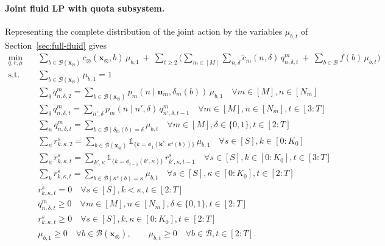 \documentclass{article}
\begin{document}
\paragraph{Joint fluid LP with quota subsystem.} Representing the complete distribution of the joint action by the variables $\mu_{b,t}$ of
Section~\ref{sec:full-fluid} gives
\begin{subequations}\label{eq:fluid-quota-subsystem}
\begin{align}
\min_{q,r,\mu} \quad
& \sum_{b \in \mathcal{B}(\mathbf{x}_\otimes)} c_\otimes(\mathbf{x}_\otimes,b)\, \mu_{b,1}
\ +\ \sum_{t \ge 2} \Bigg( \sum_{m \in [M]} \sum_{n,\delta} \tilde c_m(n,\delta)\,q^m_{n,\delta,t}
\ +\ \sum_{b \in \mathcal{B}} f(b)\,\mu_{b,t} \Bigg)
\label{eq:fluid-quota-subsystem-obj}\\
\text{s.t.} \quad
& \sum_{b \in \mathcal{B}(\mathbf{x}_\otimes)} \mu_{b,1} = 1
\label{eq:fluid-quota-subsystem-first}\\
& \sum_{\delta} q^m_{n,\delta,2} = \sum_{b \in \mathcal{B}(\mathbf{x}_\otimes)} p_m(n \mid \mathbf{n}_m,
\delta_m(b))\, \mu_{b,1} \quad \forall m \in [M], n \in [N_m]
\label{eq:fluid-quota-subsystem-initial}\\
& \sum_{\delta} q^m_{n,\delta,t} = \sum_{n',\delta} p_m(n \mid n',\delta)\, q^m_{n',\delta,t-1}
\quad \forall m \in [M], n \in [N_m], t \in [3:T]
\label{eq:fluid-quota-subsystem-flow}\\
& \sum_{n} q^m_{n,\delta,t} = \sum_{b \in \mathcal{B} \mid \delta_m(b)=\delta} \mu_{b,t}
\quad \forall m \in [M], \delta \in \{0,1\}, t \in [2:T]
\label{eq:fluid-quota-subsystem-consistency}\\
& \sum_\kappa r^s_{k,\kappa,2} = \sum_{b \in \mathcal{B}(\mathbf{x}_\otimes)} \mathds{1}_{\{k = \phi_1(\mathbf{k}^s,
\kappa^s(b))\}}\, \mu_{b,1} \quad \forall s \in [S], k \in [0:K_0]
\label{eq:fluid-quota-subsystem-qinitial}\\
& \sum_\kappa r^s_{k,\kappa,t} = \sum_{k',\kappa} \mathds{1}_{\{k=\phi_{t-1}(k',\kappa)\}}\, r^s_{k',\kappa,t-1}
\quad \forall s \in [S], k \in [0:K_0], t \in [3:T]
\label{eq:fluid-quota-subsystem-qflow}\\
& \sum_{k} r^s_{k,\kappa,t} = \sum_{b \in \mathcal{B} \mid \kappa^s(b)=\kappa} \mu_{b,t}
\quad \forall s \in [S], \kappa \in [0:K_0], t \in [2:T]
\label{eq:fluid-quota-subsystem-qconsistency}\\
& r^s_{k,\kappa,t} = 0 \quad \forall s \in [S], k < \kappa, t \in [2:T]
\label{eq:fluid-quota-subsystem-admissible}\\
& q^m_{n,\delta,t} \ge 0 \quad \forall m \in [M], n \in [N_m], \delta \in \{0,1\}, t \in [2:T]
\nonumber\\
& r^s_{k,\kappa,t} \ge 0 \quad \forall s \in [S], k, \kappa \in [0:K_0], t \in [2:T]
\nonumber\\
& \mu_{b,1} \ge 0 \quad \forall b \in \mathcal{B}(\mathbf{x}_\otimes), \qquad \mu_{b,t} \ge 0 \quad \forall b \in
\mathcal{B}, t \in [2:T].
\label{eq:fluid-quota-subsystem-nonneg}
\end{align}
\end{subequations}
\end{document}
